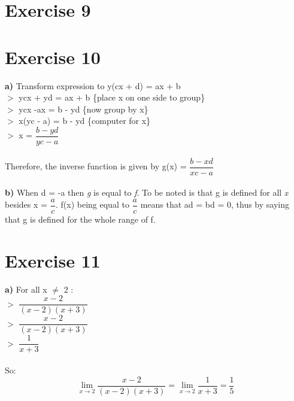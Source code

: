 \documentclass{article}
\begin{document}
  \section*{Exercise 9}
  \section*{Exercise 10}
  \textbf{a)} Transform expression to y(cx + d) = ax + b \\
  $>$ ycx + yd = ax + b \{place x on one side to group\} \\ 
  $>$ ycx -ax = b - yd  \{now group by x\} \\
  $>$ x(yc - a) = b - yd \{computer for x\} \\
  $>$ x = $\dfrac{b-yd}{yc-a}$ \\ \\
  Therefore, the inverse function is given by g(x) = $\dfrac{b-xd}{xc-a}$ \\ \\
  \textbf{b)} When d = -a then \textit{g} is equal to \textit{f}. To be noted is that g is defined for all \textit{x} besides x = $\dfrac{a}{c}$. f(x) being equal to $\dfrac{a}{c}$ means that ad = bd = 0, thus by saying that g is defined for the whole range of f.
   
  
  \section*{Exercise 11}
  
  \textbf{a)} For all x $\neq$ 2 : \\ 
  $>$ $\dfrac{x-2}{(x-2)(x+3)}$ \\
  $>$ $\dfrac{x-2}{(x-2)(x+3)}$ \\
  $>$ $\dfrac{1}{x+3}$ \\ \\
  So: 
  $$\lim_{x\to2} \dfrac{x-2}{(x-2)(x+3)} = \lim_{x\to2} \dfrac{1}{x+3} = \dfrac{1}{5}$$
  
  
\end{document}

